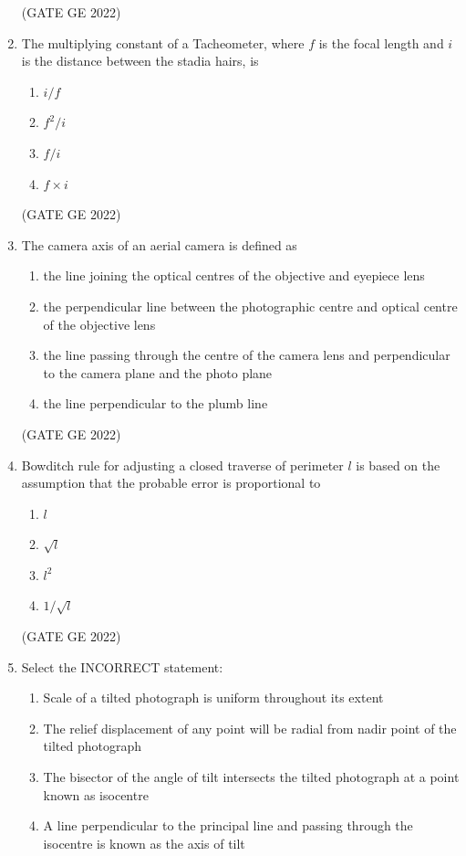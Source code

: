 \documentclass[journal,12pt,onecolumn]{IEEEtran}
\theoremstyle{remark}
\begin{document}
\begin{enumerate}
\hfill (GATE GE 2022)

\item The multiplying constant of a Tacheometer, where $f$ is the focal length and $i$ is the distance between the stadia hairs, is
\begin{enumerate}
    \item $i/f$
    \item $f^2 / i$
    \item $f / i$
    \item $f \times i$
\end{enumerate}

\hfill (GATE GE 2022)

\item The camera axis of an aerial camera is defined as
\begin{enumerate}
    \item the line joining the optical centres of the objective and eyepiece lens
    \item the perpendicular line between the photographic centre and optical centre of the objective lens
    \item the line passing through the centre of the camera lens and perpendicular to the camera plane and the photo plane
    \item the line perpendicular to the plumb line
\end{enumerate}

\hfill (GATE GE 2022)

\item Bowditch rule for adjusting a closed traverse of perimeter $l$ is based on the assumption that the probable error is proportional to
\begin{enumerate}
    \item $l$
    \item $\sqrt{l}$
    \item $l^2$
    \item $1/\sqrt{l}$
\end{enumerate}

\hfill (GATE GE 2022)

\item Select the INCORRECT statement:
\begin{enumerate}
    \item Scale of a tilted photograph is uniform throughout its extent
    \item The relief displacement of any point will be radial from nadir point of the tilted photograph
    \item The bisector of the angle of tilt intersects the tilted photograph at a point known as isocentre
    \item A line perpendicular to the principal line and passing through the isocentre is known as the axis of tilt
\end{enumerate}


\end{enumerate}
\end{document}
